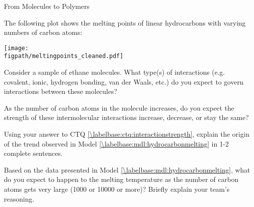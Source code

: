 \begin{activity}{From Molecules to Polymers}
\begin{model}
	The following plot shows the melting points of linear hydrocarbons with varying numbers of carbon atoms:
	
	\vspace{6pt}
	
	\centerline{\texttt{[image: \\figpath/meltingpoints\_cleaned.pdf]}}
	
	\vspace{6pt}

\end{model}

\begin{ctqs}

	
	
	\question Consider a sample of ethane molecules.  What type(s) of interactions (e.g. covalent, ionic, hydrogen bonding, van der Waals, etc.) do you expect to govern interactions between these molecules?%
	
		\begin{solution}[0.5in]
		\end{solution}
	
	\question As the number of carbon atoms in the molecule increases, do you expect the strength of these intermolecular interactions increase, decrease, or stay the same? \label{\labelbase:ctq:interactionstrength}
	
		\begin{solution}[0.5in]
		\end{solution}
	
	\question Using your answer to CTQ \ref{\labelbase:ctq:interactionstrength}, explain the origin of the trend observed in Model \ref{\labelbase:mdl:hydrocarbonmelting} in 1-2 complete sentences.
	
		\begin{solution}[2in]
		\end{solution}
	
	\question Based on the data presented in Model \ref{\labelbase:mdl:hydrocarbonmelting}, what do you expect to happen to the melting temperature as the number of carbon atoms gets very large (1000 or 10000 or more)?  Briefly explain your team's reasoning.
	
		\begin{solution}[2in]
		\end{solution}
	

\end{ctqs}
\end{activity}
